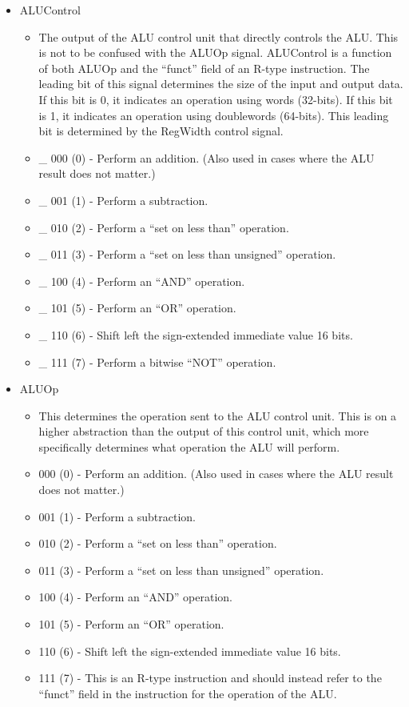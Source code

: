 \documentclass[
    paper=letter,
    parskip=half,
    fontsize=12pt,
    titlepage=firstiscover,
    toc=bibliography,
    numbers=endperiod
]{scrartcl}
\providecommand{\tightlist}{%
  \setlength{\itemsep}{0pt}\setlength{\parskip}{0pt}}
\begin{document}
\begin{itemize}
    \item ALUControl
    \begin{itemize}
        \tightlist
        \item The output of the ALU control unit that directly controls the ALU.
            This is not to be confused with the ALUOp signal. ALUControl is a
            function of both ALUOp and the ``funct'' field of an R-type
            instruction. The leading bit of this signal determines the size of
            the input and output data. If this bit is 0, it indicates an
            operation using words (32-bits). If this bit is 1, it indicates an
            operation using doublewords (64-bits). This leading bit is
            determined by the RegWidth control signal.
        \item \_ 000 (0) - Perform an addition. (Also used in cases where the ALU result does not matter.)
        \item \_ 001 (1) - Perform a subtraction.
        \item \_ 010 (2) - Perform a ``set on less than'' operation.
        \item \_ 011 (3) - Perform a ``set on less than unsigned'' operation.
        \item \_ 100 (4) - Perform an ``AND'' operation.
        \item \_ 101 (5) - Perform an ``OR'' operation.
        \item \_ 110 (6) - Shift left the sign-extended immediate value 16 bits.
        \item \_ 111 (7) - Perform a bitwise ``NOT'' operation.
    \end{itemize}

    \item ALUOp
    \begin{itemize}
        \tightlist
        \item This determines the operation sent to the ALU control unit. This is
            on a higher abstraction than the output of this control unit, which
            more specifically determines what operation the ALU will perform.
        \item 000 (0) - Perform an addition. (Also used in cases where the ALU result does not matter.)
        \item 001 (1) - Perform a subtraction.
        \item 010 (2) - Perform a ``set on less than'' operation.
        \item 011 (3) - Perform a ``set on less than unsigned'' operation.
        \item 100 (4) - Perform an ``AND'' operation.
        \item 101 (5) - Perform an ``OR'' operation.
        \item 110 (6) - Shift left the sign-extended immediate value 16 bits.
        \item 111 (7) - This is an R-type instruction and should instead refer to
            the ``funct'' field in the instruction for the operation of the ALU.
    \end{itemize}


\end{itemize}
\end{document}

